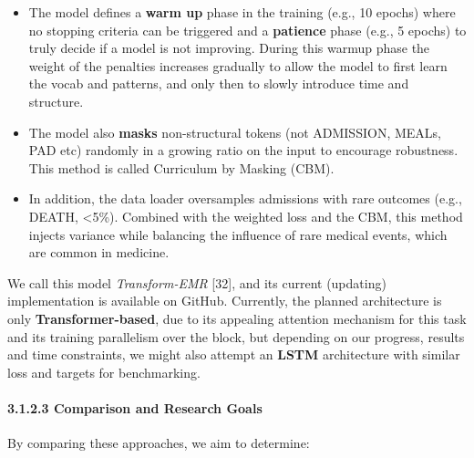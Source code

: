 \documentclass[
]{article}
\begin{document}
\begin{itemize}
\item
  The model defines a \textbf{warm up} phase in the training (e.g., 10
  epochs) where no stopping criteria can be triggered and a
  \textbf{patience} phase (e.g., 5 epochs) to truly decide if a model is
  not improving. During this warmup phase the weight of the penalties
  increases gradually to allow the model to first learn the vocab and
  patterns, and only then to slowly introduce time and structure.
\item
  The model also \textbf{masks} non-structural tokens (not ADMISSION,
  MEALs, PAD etc) randomly in a growing ratio on the input to encourage
  robustness. This method is called Curriculum by Masking (CBM).
\item
  In addition, the data loader oversamples admissions with rare outcomes
  (e.g., DEATH, \textless5\%). Combined with the weighted loss and the
  CBM, this method injects variance while balancing the influence of
  rare medical events, which are common in medicine.
\end{itemize}

We call this model \emph{Transform-EMR} {[}32{]}, and its current
(updating) implementation is available on GitHub. Currently, the planned
architecture is only \textbf{Transformer-based}, due to its appealing
attention mechanism for this task and its training parallelism over the
block, but depending on our progress, results and time constraints, we
might also attempt an \textbf{LSTM} architecture with similar loss and
targets for benchmarking.

\paragraph{3.1.2.3 Comparison and Research
Goals}\label{comparison-and-research-goals}

By comparing these approaches, we aim to determine:
\end{document}
